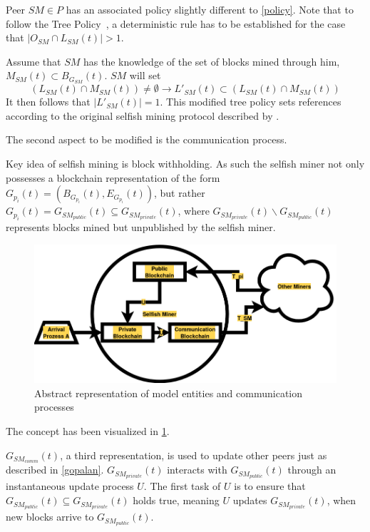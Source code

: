 Peer $SM \in P$ has an associated policy slightly different to \ref{policy}. Note that to follow the Tree Policy~\citep{gopalan}, a deterministic rule has to be established for the case that $|O_{SM} \cap L_{SM}(t)| > 1$.

Assume that $SM$ has the knowledge of the set of blocks mined through him, $M_{SM}(t) \subset B_{G_{SM}}(t)$. $SM$ will set 
\begin{equation}
(L_{SM}(t) \cap M_{SM}(t)) \neq \emptyset \rightarrow L'_{SM}(t) \subset ( L_{SM}(t) \cap M_{SM}(t)) 
\label{smpolicy}
\end{equation}
It then follows that $|L'_{SM}(t)|=1$.
This modified tree policy sets references according to the original selfish mining protocol described by \citeauthor{eyal}.

The second aspect to be modified is the communication process. 

Key idea of selfish mining is block withholding. As such the selfish miner not only possesses a blockchain representation of the form $G_{p_i}(t) = (B_{G_{p_i}}(t),E_{G_{p_i}}(t))$, but rather $G_{p_i}(t) = G_{SM_{public}}(t)\subseteq G_{SM_{private}}(t)$, where $G_{SM_{private}}(t)\backslash G_{SM_{public}}(t)$ represents blocks mined but unpublished by the selfish miner.

\begin{figure}
\includegraphics[width=\linewidth]{figures/model_vis.png}
\caption{Abstract representation of model entities and communication processes}
\label{fig:model_vis}
\end{figure}

The concept has been visualized in \ref{fig:model_vis}.

$G_{SM_{comm}}(t)$, a third representation, is used to update other peers just as described in \ref{gopalan}. $G_{SM_{private}}(t)$ interacts with $G_{SM_{public}}(t)$ through an instantaneous update process $U$.
The first task of $U$ is to ensure that $G_{SM_{public}}(t)\subseteq G_{SM_{private}}(t)$ holds true, meaning $U$ updates $G_{SM_{private}}(t)$, when new blocks arrive to $G_{SM_{public}}(t)$.

